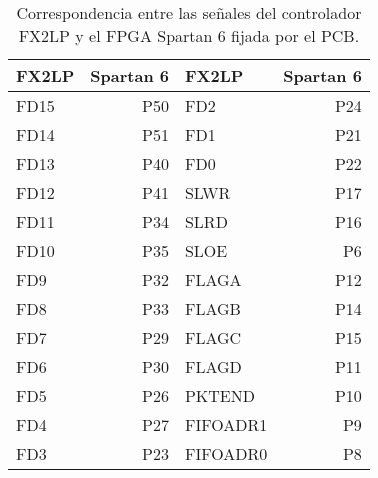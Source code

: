 \begin{longtable}{|lr| |lr|}
	\hline
	\textbf{FX2LP} & \textbf{Spartan 6}&\textbf{FX2LP} & \textbf{Spartan 6} \\
	\hline
	\endhead
	\hline
	\caption{Correspondencia entre las señales del controlador FX2LP y el FPGA Spartan 6 fijada por el PCB.}%
	\label{tab:fpga:conexion}
	\endlastfoot
	\hline
	\endfoot
	FD15 & P50 &FD2 & P24\\
	FD14 & P51 &FD1 & P21\\
	FD13 & P40 &FD0 & P22\\
	FD12 & P41 &SLWR & P17\\
	FD11 & P34 &SLRD & P16\\
	FD10 & P35 &SLOE & P6\\
	FD9 & P32 &FLAGA & P12\\
	FD8 & P33 &FLAGB & P14\\
	FD7 & P29 &FLAGC & P15\\
	FD6 & P30 &FLAGD & P11\\
	FD5 & P26 &PKTEND & P10\\
	FD4 & P27 &FIFOADR1 & P9\\
	FD3 & P23 &FIFOADR0 & P8\\
\end{longtable}

